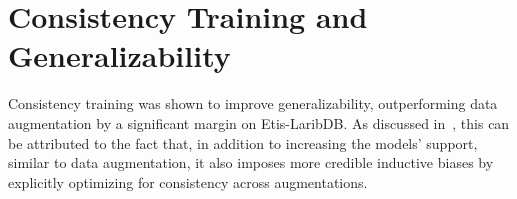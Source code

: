 \section{Consistency Training and Generalizability}
Consistency training was shown to improve generalizability, outperforming data augmentation by a significant margin on Etis-LaribDB. As discussed in~, this can be attributed to the fact that, in addition to increasing the models' support, similar to data augmentation, it also imposes more credible inductive biases by explicitly optimizing for consistency across augmentations. 



